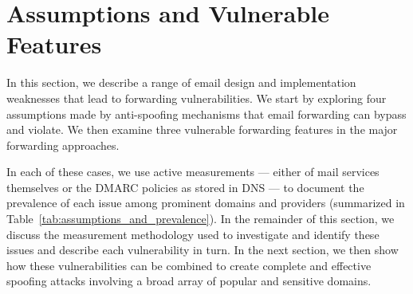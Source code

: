 \section{Assumptions and Vulnerable Features}
\label{sec:assumptions}

In this section, we describe a range of email design and
implementation weaknesses that lead to forwarding vulnerabilities.
We start by exploring four assumptions made by anti-spoofing mechanisms
that email forwarding can bypass and violate.  We then examine
three vulnerable forwarding features in the major forwarding
approaches.

In each of these cases, we use active
measurements --- either of mail services themselves or the DMARC policies
as stored in DNS --- to document the prevalence of each issue
among prominent domains and
providers (summarized in Table~\ref{tab:assumptions_and_prevalence}).
In the remainder of this section, we discuss the measurement
methodology used to investigate and identify these issues and
describe each vulnerability in turn.  In the next section,
we then show how these vulnerabilities can
be combined to create complete and effective spoofing attacks
involving a broad array of popular and sensitive domains.





